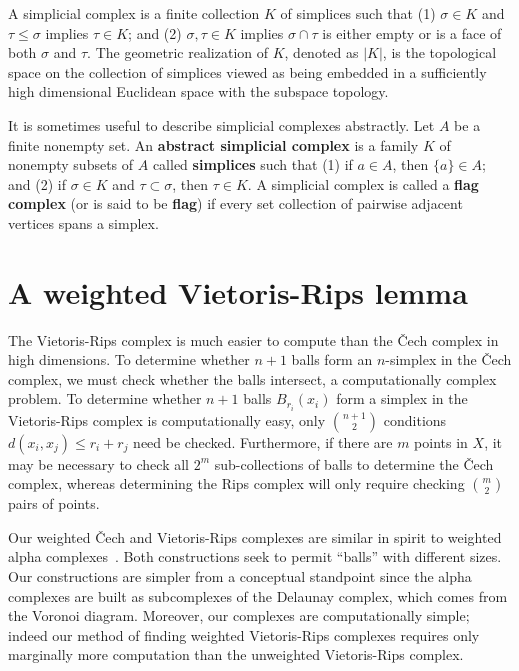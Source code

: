 \documentclass{amsart}
\newtheorem*{fibering lemma}{Fibering Lemma}
\newtheorem*{decomposition lemma}{Decomposition Lemma}
\newtheorem*{hurewicz theorem}{Hurewicz Theorem}
\theoremstyle{definition}
\newcommand{\df}[1]{{{\bf #1}}}
\begin{document}
A simplicial complex is a finite collection $K$ of simplices such that (1) $\sigma \in K$ and $\tau \leq \sigma$ implies $\tau \in K$; and (2) $\sigma, \tau \in K$ implies $\sigma \cap \tau$ is either empty or is a face of both $\sigma$ and $\tau$. The geometric realization of $K$, denoted as $|K|$, is the topological space on the collection of simplices viewed as being embedded in a sufficiently high dimensional Euclidean space with the subspace topology. \begin{comment} A triangulation of a topological space $\mathbb{X}$ is a simplicial complex $K$ together with a homeomorphism between $\mathbb{X}$ and the underlying space $|K|$. The topological space is triangulable if it has a triangulation. \end{comment}

It is sometimes useful to describe simplicial complexes abstractly. Let $A$ be a finite nonempty set. An \df{abstract simplicial complex} is a family $K$ of nonempty subsets of $A$ called \df{simplices} such that (1) if $a\in A$, then $\{a\}\in A$; and (2) if $\sigma\in K$ and $\tau\subset \sigma$, then $\tau\in K$. A simplicial complex is called a \df{flag complex} (or is said to be \df{flag}) if every set collection of pairwise adjacent vertices spans a simplex.




\fi 

\section{A weighted Vietoris-Rips lemma}

The Vietoris-Rips complex is much easier to compute than the \v{C}ech complex in high dimensions. To determine whether $n+1$ balls form an $n$-simplex in the \v{C}ech complex, we must check whether the balls intersect, a computationally complex problem. To determine whether $n+1$ balls $B_{r_i}(x_i)$ form a simplex in the Vietoris-Rips complex is computationally easy, only $\binom{n+1}{2}$ conditions $d(x_i,x_j) \leq r_i +r_j$ need be checked.  Furthermore, if there are $m$ points in $X$, it may be necessary to check all $2^m$ sub-collections of balls to determine the \v{C}ech complex, whereas determining the Rips complex will only require checking $\binom{m}{2}$ pairs of points.

Our weighted \v{C}ech and Vietoris-Rips complexes are similar in spirit to weighted alpha complexes~\cite[III.4]{Ede:10}. Both constructions seek to permit ``balls'' with different sizes. Our constructions are simpler from a conceptual standpoint since the alpha complexes are built as subcomplexes of the Delaunay complex, which comes from the Voronoi diagram. Moreover, our complexes are computationally simple; indeed our method of finding weighted Vietoris-Rips complexes requires only marginally more computation than the unweighted Vietoris-Rips complex.
\end{document}
